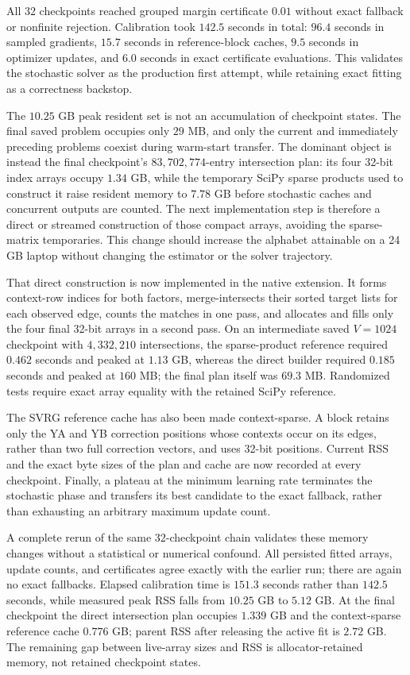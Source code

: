 \documentclass[11pt]{article}
\begin{document}
All 32 checkpoints reached grouped margin certificate $0.01$ without exact
fallback or nonfinite rejection.  Calibration took $142.5$ seconds in total:
$96.4$ seconds in sampled gradients, $15.7$ seconds in reference-block
caches, $9.5$ seconds in optimizer updates, and $6.0$ seconds in exact
certificate evaluations.  This validates the stochastic solver as the
production first attempt, while retaining exact fitting as a correctness
backstop.

The $10.25$ GB peak resident set is not an accumulation of checkpoint
states.  The final saved problem occupies only $29$ MB, and only the current
and immediately preceding problems coexist during warm-start transfer.  The
dominant object is instead the final checkpoint's $83{,}702{,}774$-entry
intersection plan: its four 32-bit index arrays occupy $1.34$ GB, while the
temporary SciPy sparse products used to construct it raise resident memory
to $7.78$ GB before stochastic caches and concurrent outputs are counted.
The next implementation step is therefore a direct or streamed construction
of those compact arrays, avoiding the sparse-matrix temporaries.  This change
should increase the alphabet attainable on a 24 GB laptop without changing
the estimator or the solver trajectory.

That direct construction is now implemented in the native extension.  It
forms context-row indices for both factors, merge-intersects their sorted
target lists for each observed edge, counts the matches in one pass, and
allocates and fills only the four final 32-bit arrays in a second pass.  On an
intermediate saved $V=1024$ checkpoint with $4{,}332{,}210$ intersections,
the sparse-product reference required $0.462$ seconds and peaked at $1.13$
GB, whereas the direct builder required $0.185$ seconds and peaked at $160$
MB; the final plan itself was $69.3$ MB.  Randomized tests require exact
array equality with the retained SciPy reference.

The SVRG reference cache has also been made context-sparse.  A block retains
only the YA and YB correction positions whose contexts occur on its edges,
rather than two full correction vectors, and uses 32-bit positions.  Current
RSS and the exact byte sizes of the plan and cache are now recorded at every
checkpoint.  Finally, a plateau at the minimum learning rate terminates the
stochastic phase and transfers its best candidate to the exact fallback,
rather than exhausting an arbitrary maximum update count.

A complete rerun of the same 32-checkpoint chain validates these memory
changes without a statistical or numerical confound.  All persisted fitted
arrays, update counts, and certificates agree exactly with the earlier run;
there are again no exact fallbacks.  Elapsed calibration time is $151.3$
seconds rather than $142.5$ seconds, while measured peak RSS falls from
$10.25$ GB to $5.12$ GB.  At the final checkpoint the direct intersection
plan occupies $1.339$ GB and the context-sparse reference cache $0.776$ GB;
parent RSS after releasing the active fit is $2.72$ GB.  The remaining gap
between live-array sizes and RSS is allocator-retained memory, not retained
checkpoint states.
\end{document}
